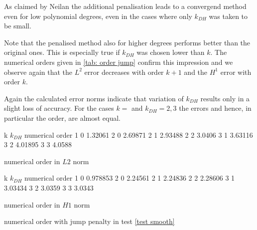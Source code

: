 As claimed by Neilan the additional penalisation leads to a convergend method even for low polynomial degrees, even in the cases where only $k_{DH}$ was taken to be small.

Note that the penalised method also for higher degrees performs better than the original ones. This is especially true if $k_{DH}$ was chosen lower than $k$. The numerical orders given in \ref{tab: order jump} confirm this impression and we observe again that the $L^2$ error decreases with order $k+1$ and the $H^1$ error with order $k$. 

Again the calculated error norms indicate that variation of $k_{DH}$ results only in a slight loss of accuracy. For the cases $k=$ and $k_{DH} = 2,3$ the errors and hence, in particular the order, are almost equal. 


\begin{table}[H]
\centering
\begin{subtable}[b]{0.45\textwidth}
	\pgfplotstabletypeset
	{
		k $k_{DH}$ {numerical order}
		1 0 1.32061
		2 0 2.69871
		2 1 2.93488
		2 2 3.0406
		3 1 3.63116
		3 2 4.01895
		3 3 4.0588
	}
	\caption{numerical order in $L2$ norm}
	\end{subtable}
	\begin{subtable}[b]{0.45\textwidth}
	\pgfplotstabletypeset
	{
		k $k_{DH}$ {numerical order}
		1 0 0.978853
		2 0 2.24561
		2 1 2.24836
		2 2 2.28606
		3 1 3.03434
		3 2 3.0359
		3 3  3.0343
	}
	\caption{numerical order in $H1$ norm}
	\end{subtable}
	\caption{numerical order with jump penalty in test \ref{test smooth}}
\label{tab: order jump}
\end{table}
